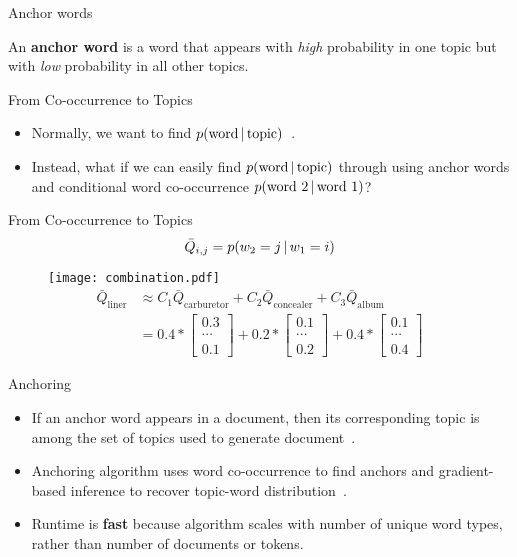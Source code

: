 \begin{frame}{Anchor words}
\begin{definition}
An \textbf{anchor word} is a word that appears with \emph{high} probability in one topic but with \emph{low} probability in all other topics.
\end{definition}
\end{frame}

\begin{frame}{From Co-occurrence to Topics}
\begin{itemize}
\item Normally, we want to find \(p(\text{word} \, | \, \text{topic}) \)~\citep{blei-2003}.
\item Instead, what if we can easily find \(p(\text{word} \, | \, \text{topic})\) through using anchor words and conditional word co-occurrence \(p(\text{word 2} \, | \, \text{word 1})\)?
\end{itemize}
\end{frame}


\begin{frame}{From Co-occurrence to Topics}
\begin{equation*}
\bar{Q}_{i,j} = p(w_2 = j \, | \, w_1 = i)
\end{equation*}
\begin{figure}
\texttt{[image: combination.pdf]} 
\begin{align*}
\bar{Q}_{\text{liner}} &\approx C_1 \bar{Q}_{\text{carburetor}} + C_2 \bar{Q}_{\text{concealer}} + C_3 \bar{Q}_{\text{album}} \\
&= 0.4 * \begin{bmatrix} 0.3 \\ \cdots \\ 0.1 \end{bmatrix} + 0.2 * \begin{bmatrix} 0.1 \\ \cdots \\ 0.2 \end{bmatrix} + 0.4 * \begin{bmatrix} 0.1 \\ \cdots \\ 0.4 \end{bmatrix} 
\end{align*}
\end{figure}
\end{frame}



\begin{frame}{Anchoring}
\begin{itemize}
\item If an anchor word appears in a document, then its corresponding topic is among the set of topics used to generate document~\citep{arora-2012-anchor}.
\item Anchoring algorithm uses word co-occurrence to find anchors and gradient-based inference to recover topic-word distribution~\citep{arora-2013}.
\item Runtime is \textbf{fast} because algorithm scales with number of unique word types, rather than number of documents or tokens.
\end{itemize}
\end{frame}

